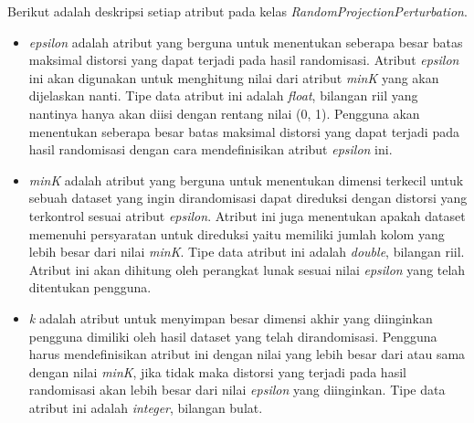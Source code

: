 Berikut adalah deskripsi setiap atribut pada kelas \textit{RandomProjectionPerturbation}.
\begin{itemize}
	\item \textit{epsilon} adalah atribut yang berguna untuk menentukan seberapa besar batas maksimal distorsi yang dapat terjadi pada hasil randomisasi. Atribut \textit{epsilon} ini akan digunakan untuk menghitung nilai dari atribut \textit{minK} yang akan dijelaskan nanti. Tipe data atribut ini adalah \textit{float}, bilangan riil yang nantinya hanya akan diisi dengan rentang nilai (0, 1). Pengguna akan menentukan seberapa besar batas maksimal distorsi yang dapat terjadi pada hasil randomisasi dengan cara mendefinisikan atribut \textit{epsilon} ini.
	\item \textit{minK} adalah atribut yang berguna untuk menentukan dimensi terkecil untuk sebuah dataset yang ingin dirandomisasi dapat direduksi dengan distorsi yang terkontrol sesuai atribut \textit{epsilon}. Atribut ini juga menentukan apakah dataset memenuhi persyaratan untuk direduksi yaitu memiliki jumlah kolom yang lebih besar dari nilai \textit{minK}. Tipe data atribut ini adalah \textit{double}, bilangan riil. Atribut ini akan dihitung oleh perangkat lunak sesuai nilai \textit{epsilon} yang telah ditentukan pengguna.
	\item \textit{k} adalah atribut untuk menyimpan besar dimensi akhir yang diinginkan pengguna dimiliki oleh hasil dataset yang telah dirandomisasi. Pengguna harus mendefinisikan atribut ini dengan nilai yang lebih besar dari atau sama dengan nilai \textit{minK}, jika tidak maka distorsi yang terjadi pada hasil randomisasi akan lebih besar dari nilai \textit{epsilon} yang diinginkan. Tipe data atribut ini adalah \textit{integer}, bilangan bulat.
\end{itemize}

